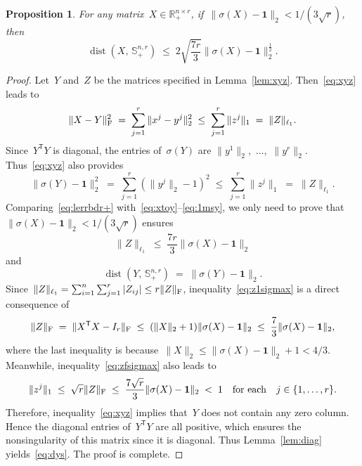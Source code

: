 \documentclass[11pt,a4paper]{article}  %
\newtheorem{proposition}{Proposition}%
\theoremstyle{definition}
\DeclareMathOperator{\dist}{dist}
\newcommand{\RR}{\mathbb{R}}
\newcommand{\col}{r}
\newcommand{\stf}[1]{\mathbb{S}^{#1}}
\newcommand{\fro}{{\scriptstyle{\textnormal{F}}}}
\newcommand{\trs}{{\scriptstyle{\mathsf{T}}}}
\newcommand{\ones}{\mathbf{1}}
\begin{document}
\begin{proposition}
    \label{prop:lerrbdr+}
    For any matrix~$X\in \RR^{n\times \col}_+$, if~$\|\sigma(X) -\ones\|_2 < 1/(3\sqrt{\col})$, then
    \begin{equation}
        \label{eq:lerrbdr+}
        \dist(X,\, \stf{n,\col}_+) \;\le\; 2\sqrt{\frac{7\col}{3}} \|\sigma(X) -\ones\|_2^{\frac{1}{2}}.
    \end{equation}
\end{proposition}
\begin{proof}
    Let~$Y$ and~$Z$ be the matrices specified in  Lemma~\ref{lem:xyz}. Then~\eqref{eq:xyz} leads to
    \begin{equation}
        \label{eq:xtoy}
        \|X-Y\|_\fro^2 \;=\; \sum_{j=1}^\col \|x^j - y^j \|_2^2  \;\le\;  \sum_{j=1}^\col \|z^j\|_1
        \;=\;\|Z\|_{\ell_1}.
    \end{equation}
    Since~$Y^\trs Y$ is diagonal, the entries of~$\sigma(Y)$ are
    \mbox{$\|y^1\|_2$,~$\dots$,~$\|y^\col\|_2$}. Thus~\eqref{eq:xyz} also provides
    \begin{equation}
    \label{eq:1msy}
    \|\sigma(Y) - \ones\|_2^2 \;=\; \sum_{j=1}^\col (\|y^j\|_2 - 1)^2 \;\le\; \sum_{j=1}^\col
    \|z^j\|_1 \;=\; \|Z\|_{\ell_1}.
    \end{equation}
    Comparing~\eqref{eq:lerrbdr+} with~\eqref{eq:xtoy}--\eqref{eq:1msy},
    we only need to prove that~$\|\sigma(X) -\ones\|_2 <\! 1/(3\sqrt{\col})$ ensures%
     \begin{equation}
         \label{eq:z1sigmax} \|Z\|_{\ell_1} \;\le\; \frac{7\col}{3} \|\sigma(X) -\ones\|_2
     \end{equation}
     and
    \begin{equation}
        \label{eq:dys} \dist(Y, \, \stf{n, \col}_+) \;=\; \|\sigma(Y) - \ones\|_2.
    \end{equation}
    Since~$\|Z\|_{\ell_1}=\sum_{i=1}^n\sum_{j=1}^\col|Z_{ij}|  \le \col\|Z\|_\fro$, inequality~\eqref{eq:z1sigmax} is a direct consequence of
    \begin{equation}
        \label{eq:zfsigmax}
        \|Z\|_\fro \;=\; \|X^\trs X -I_\col\|_\fro
        \;\le\; (\|X\|_2 + 1)\|\sigma(X) -\ones\|_2
        \;\le\; \frac{7}{3} \|\sigma(X) -\ones\|_2,
    \end{equation}
    where the last inequality is because~$\|X\|_2 \le\|\sigma(X) -\ones\|_2 + 1 < 4/3$.
    Meanwhile, inequality~\eqref{eq:zfsigmax} also leads to
    \[
        \|z^j\|_1 \;\le\; \sqrt{\col}\|Z\|_\fro \;\le\; \frac{7\sqrt{\col}}{3} \|\sigma(X) -\ones\|_2 \;<\; 1
        \quad \text{for each} \quad j\in\{1, \dots, \col\}.
    \]
    Therefore, inequality~\eqref{eq:xyz} implies that~$Y$ does not contain any zero column.
    Hence the diagonal entries of~$Y^\trs Y$ are all positive, which
    ensures the nonsingularity of this matrix since it is diagonal.
    Thus Lemma~\ref{lem:diag} yields~\eqref{eq:dys}. The proof is complete.
\end{proof}
\end{document}

